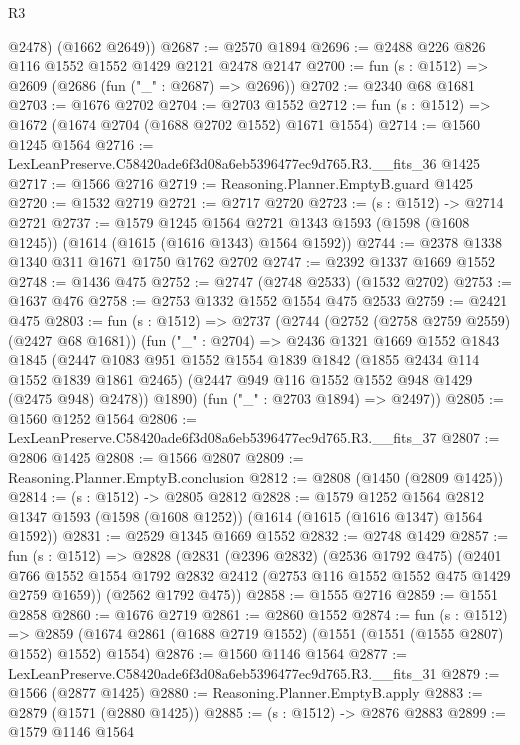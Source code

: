 \begin{lexlean}{R3}
\begin{coremodule}
        @2478)
      (@1662 @2649))
@2687 := @2570 @1894
@2696 := @2488 @226 @826 @116 @1552 @1552 @1429 @2121 @2478 @2147
@2700 := fun (s : @1512) => @2609 (@2686 (fun ("_" : @2687) => @2696))
@2702 := @2340 @68 @1681
@2703 := @1676 @2702
@2704 := @2703 @1552
@2712 := fun (s : @1512) => @1672 (@1674 @2704 (@1688 @2702 @1552) @1671 @1554)
@2714 := @1560 @1245 @1564
@2716 := LexLeanPreserve.C58420ade6f3d08a6eb5396477ec9d765.R3.__fits_36 @1425
@2717 := @1566 @2716
@2719 := Reasoning.Planner.EmptyB.guard @1425
@2720 := @1532 @2719
@2721 := @2717 @2720
@2723 := (s : @1512) -> @2714 @2721
@2737 := @1579
    @1245
    @1564
    @2721
    @1343
    @1593
    (@1598 (@1608 @1245))
    (@1614 (@1615 (@1616 @1343) @1564 @1592))
@2744 := @2378 @1338 @1340 @311 @1671 @1750 @1762 @2702
@2747 := @2392 @1337 @1669 @1552
@2748 := @1436 @475
@2752 := @2747 (@2748 @2533) (@1532 @2702)
@2753 := @1637 @476
@2758 := @2753 @1332 @1552 @1554 @475 @2533
@2759 := @2421 @475
@2803 := fun (s : @1512) =>
  @2737
    (@2744
      (@2752 (@2758 @2759 @2559) (@2427 @68 @1681))
      (fun ("_" : @2704) =>
      @2436
        @1321
        @1669
        @1552
        @1843
        @1845
        (@2447
          @1083
          @951
          @1552
          @1554
          @1839
          @1842
          (@1855 @2434 @114 @1552 @1839 @1861 @2465)
          (@2447 @949 @116 @1552 @1552 @948 @1429 (@2475 @948) @2478))
        @1890)
      (fun ("_" : @2703 @1894) => @2497))
@2805 := @1560 @1252 @1564
@2806 := LexLeanPreserve.C58420ade6f3d08a6eb5396477ec9d765.R3.__fits_37
@2807 := @2806 @1425
@2808 := @1566 @2807
@2809 := Reasoning.Planner.EmptyB.conclusion
@2812 := @2808 (@1450 (@2809 @1425))
@2814 := (s : @1512) -> @2805 @2812
@2828 := @1579
    @1252
    @1564
    @2812
    @1347
    @1593
    (@1598 (@1608 @1252))
    (@1614 (@1615 (@1616 @1347) @1564 @1592))
@2831 := @2529 @1345 @1669 @1552
@2832 := @2748 @1429
@2857 := fun (s : @1512) =>
  @2828
    (@2831
      (@2396 @2832)
      (@2536 @1792 @475)
      (@2401 @766 @1552 @1554 @1792 @2832 @2412 (@2753 @116 @1552 @1552 @475 @1429 @2759 @1659))
      (@2562 @1792 @475))
@2858 := @1555 @2716
@2859 := @1551 @2858
@2860 := @1676 @2719
@2861 := @2860 @1552
@2874 := fun (s : @1512) =>
  @2859 (@1674 @2861 (@1688 @2719 @1552) (@1551 (@1551 (@1555 @2807) @1552) @1552) @1554)
@2876 := @1560 @1146 @1564
@2877 := LexLeanPreserve.C58420ade6f3d08a6eb5396477ec9d765.R3.__fits_31
@2879 := @1566 (@2877 @1425)
@2880 := Reasoning.Planner.EmptyB.apply
@2883 := @2879 (@1571 (@2880 @1425))
@2885 := (s : @1512) -> @2876 @2883
@2899 := @1579
    @1146
    @1564

\end{coremodule}
\end{lexlean}
